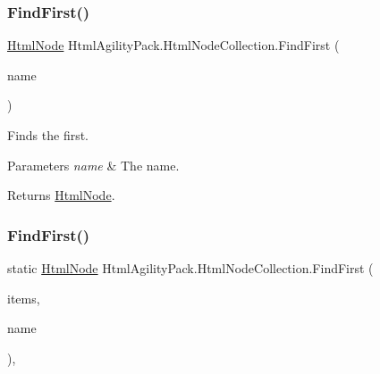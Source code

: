 \subsubsection{\texorpdfstring{Find\+First()}{FindFirst()}\hspace{0.1cm}{\footnotesize\ttfamily [1/2]}}
{\footnotesize\ttfamily \hyperlink{class_html_agility_pack_1_1_html_node}{Html\+Node} Html\+Agility\+Pack.\+Html\+Node\+Collection.\+Find\+First (\begin{DoxyParamCaption}\item[{string}]{name }\end{DoxyParamCaption})\hspace{0.3cm}{\ttfamily [inline]}}



Finds the first. 


\begin{DoxyParams}{Parameters}
{\em name} & The name.\\
\hline
\end{DoxyParams}
\begin{DoxyReturn}{Returns}
\hyperlink{class_html_agility_pack_1_1_html_node}{Html\+Node}.
\end{DoxyReturn}
\mbox{\label{class_html_agility_pack_1_1_html_node_collection_a0475c613be6aca340e6794722f15915c}} 
\subsubsection{\texorpdfstring{Find\+First()}{FindFirst()}\hspace{0.1cm}{\footnotesize\ttfamily [2/2]}}
{\footnotesize\ttfamily static \hyperlink{class_html_agility_pack_1_1_html_node}{Html\+Node} Html\+Agility\+Pack.\+Html\+Node\+Collection.\+Find\+First (\begin{DoxyParamCaption}\item[{\hyperlink{class_html_agility_pack_1_1_html_node_collection}{Html\+Node\+Collection}}]{items,  }\item[{string}]{name }\end{DoxyParamCaption})\hspace{0.3cm}{\ttfamily [inline]}, {\ttfamily [static]}}



